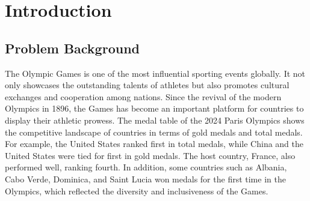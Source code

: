 \documentclass{mcmthesis}
\renewcommand{\contentsname}{\hspace*{\fill}\Large\bfseries Contents \hspace*{\fill}}
\begin{document}
\begin{abstract}
In Task 4: While analyzing the distribution of Olympic medals, we note that approximately 80\% of the medals are amassed by just 20\% of the athletes. This phenomenon indicates that there is a significant \textbf{Pareto effect}. Secondly, we have found that certain countries have performed exceptionally well in specific events, even achieving a complete monopoly on medals.In response to this phenomenon, we suggest that the Olympic Committees of various countries study the training methods and resource allocation of these successful countries to make improvements in the corresponding events. In addition,we have written a letter proposing suggestions to the National Olympic Committee for optimizing sports strategies.

Finally, we perform a sensitivity analysis of the model and investigate the effect of changes in the variable parameters of the model on the results.

\begin{keywords}
Multiple linear regression; Bayesian model; Wilcoxon signed Rank Test;  K-Means;
\end{keywords}

\end{abstract}

\maketitle

\tableofcontents   %
\thispagestyle{empty}

\newpage

\section{Introduction}

\subsection{Problem Background}

The Olympic Games is one of the most influential sporting events globally. It not only showcases the outstanding talents of athletes but also promotes cultural exchanges and cooperation among nations. Since the revival of the modern Olympics in 1896, the Games has become an important platform for countries to display their athletic prowess. The medal table of the 2024 Paris Olympics shows the competitive landscape of countries in terms of gold medals and total medals. For example, the United States ranked first in total medals, while China and the United States were tied for first in gold medals. The host country, France, also performed well, ranking fourth. In addition, some countries such as Albania, Cabo Verde, Dominica, and Saint Lucia won medals for the first time in the Olympics, which reflected the diversity and inclusiveness of the Games.
\end{document}
